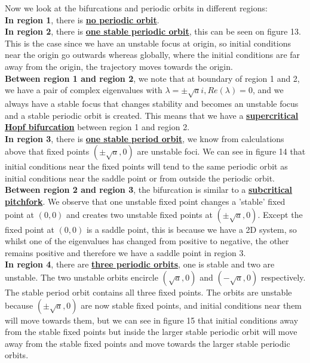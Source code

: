 \documentclass[10pt]{article}
\begin{document}
\noindent Now we look at the bifurcations and periodic orbits in different regions:\\
\textbf{In region 1}, there is \underline{\textbf{no periodic orbit}}.\\
\textbf{In region 2}, there is \underline{\textbf{one stable periodic orbit}}, this can be seen on figure 13. This is the case since we have an unstable focus at origin, so initial conditions near the origin go outwards whereas globally, where the initial conditions are far away from the origin, the trajectory moves towards the origin.\\
\textbf{Between region 1 and region 2}, we note that at boundary of region 1 and 2, we have a pair of complex eigenvalues with $\lambda=\pm\sqrt{a}i, Re(\lambda)=0$, and we always have a stable focus that changes stability and becomes an unstable focus and a stable periodic orbit is created. This means that we have a \underline{\textbf{supercritical Hopf bifurcation}} between region 1 and region 2.\\
\textbf{In region 3}, there is \underline{\textbf{one stable period orbit}}, we know from calculations above that fixed points $(\pm\sqrt{a},0)$ are unstable foci. We can see in figure 14 that initial conditions near the fixed points will tend to the same periodic orbit as initial conditions near the saddle point or from outside the periodic orbit.\\
\textbf{Between region 2 and region 3}, the bifurcation is similar to a \underline{\textbf{subcritical pitchfork}}. We observe that one unstable fixed point changes a 'stable' fixed point at $(0,0)$ and creates two unstable fixed points at $(\pm\sqrt{a},0)$. Except the fixed point at $(0,0)$ is a saddle point, this is because we have a 2D system, so whilst one of the eigenvalues has changed from positive to negative, the other remains positive and therefore we have a saddle point in region 3.\\
\textbf{In region 4}, there are \underline{\textbf{three periodic orbits}}, one is stable and two are unstable. The two unstable orbits encircle $(\sqrt{a},0)$ and $(-\sqrt{a},0)$ respectively. The stable period orbit contains all three fixed points. The orbits are unstable because $(\pm\sqrt{a},0)$ are now stable fixed points, and initial conditions near them will move towards them, but we can see in figure 15 that initial conditions away from the stable fixed points but inside the larger stable periodic orbit will move away from the stable fixed points and move towards the larger stable periodic orbits.\\
\end{document}
